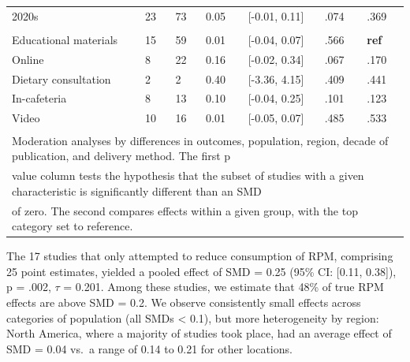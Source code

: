 \documentclass[sn-nature,referee,pdflatex]{sn-jnl}
\begin{document}
\begin{table}[!ht]
\begin{tabular}[t]{lllllll}
\hspace{1em}2020s & 23 & 73 & 0.05 & {}[-0.01, 0.11] & .074 & .369\\
\addlinespace[0.3em]
\multicolumn{7}{l}{\textbf{Method of Delivery}}\\
\hspace{1em}Educational materials & 15 & 59 & 0.01 & {}[-0.04, 0.07] & .566 & \textbf{ref}\\
\hspace{1em}Online & 8 & 22 & 0.16 & {}[-0.02, 0.34] & .067 & .170\\
\hspace{1em}Dietary consultation & 2 & 2 & 0.40 & {}[-3.36, 4.15] & .409 & .441\\
\hspace{1em}In-cafeteria & 8 & 13 & 0.10 & {}[-0.04, 0.25] & .101 & .123\\
\hspace{1em}Video & 10 & 16 & 0.01 & {}[-0.05, 0.07] & .485 & .533\\
\bottomrule
\multicolumn{7}{l}{\textsuperscript{} Moderation analyses by differences in outcomes, population, region, decade of publication, and delivery method. The first p}\\
\multicolumn{7}{l}{value column tests the hypothesis that the subset of studies with a given characteristic is significantly different than an SMD}\\
\multicolumn{7}{l}{of zero. The second compares effects within a given group, with the top category set to reference.}\\
\end{tabular}
\end{table}

The 17 studies that only attempted to reduce consumption of RPM,
comprising 25 point estimates, yielded a pooled effect of SMD = 0.25
(95\% CI: {[}0.11, 0.38{]}), p = .002, \(\tau\) = 0.201. Among these
studies, we estimate that 48\% of true RPM effects are above SMD = 0.2.
We observe consistently small effects across categories of population
(all SMDs \textless{} 0.1), but more heterogeneity by region: North
America, where a majority of studies took place, had an average effect
of SMD = 0.04 vs.~a range of 0.14 to 0.21 for other locations.

\end{document}
